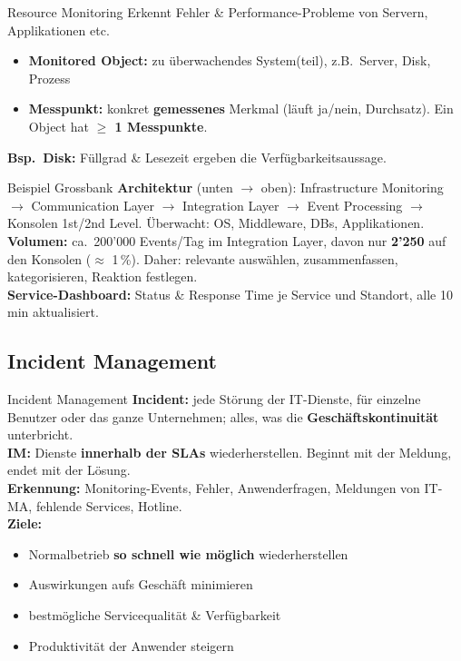 \documentclass[a4paper, fontsize=7pt]{scrartcl}
\begin{document}
\begin{mainbox}{Resource Monitoring}
Erkennt Fehler \& Performance-Probleme von Servern, Applikationen etc.
\begin{itemize}
    \item \textbf{Monitored Object:} zu überwachendes System(teil), z.B.\ Server,
          Disk, Prozess
    \item \textbf{Messpunkt:} konkret \textbf{gemessenes} Merkmal (läuft ja/nein,
          Durchsatz). Ein Object hat \textbf{$\ge$ 1 Messpunkte}.
\end{itemize}
\textbf{Bsp.\ Disk:} Füllgrad \& Lesezeit ergeben die Verfügbarkeitsaussage.
\end{mainbox}

\begin{subbox}{Beispiel Grossbank}
\textbf{Architektur} (unten $\to$ oben): Infrastructure Monitoring $\to$
Communication Layer $\to$ Integration Layer $\to$ Event Processing $\to$
Konsolen 1st/2nd Level. Überwacht: OS, Middleware, DBs, Applikationen.\\
\textbf{Volumen:} ca.\ 200'000 Events/Tag im Integration Layer, davon nur
\textbf{2'250} auf den Konsolen ($\approx$ 1\,\%). Daher: relevante auswählen,
zusammenfassen, kategorisieren, Reaktion festlegen.\\
\textbf{Service-Dashboard:} Status \& Response Time je Service und Standort,
alle 10\,min aktualisiert.
\end{subbox}

\subsection{Incident Management}

\begin{mainbox}{Incident Management}
\textbf{Incident:} jede Störung der IT-Dienste, für einzelne Benutzer oder das
ganze Unternehmen; alles, was die \textbf{Geschäftskontinuität} unterbricht.\\
\textbf{IM:} Dienste \textbf{innerhalb der SLAs} wiederherstellen. Beginnt mit
der Meldung, endet mit der Lösung.\\
\textbf{Erkennung:} Monitoring-Events, Fehler, Anwenderfragen, Meldungen von
IT-MA, fehlende Services, Hotline.\\
\textbf{Ziele:}
\begin{itemize}
    \item Normalbetrieb \textbf{so schnell wie möglich} wiederherstellen
    \item Auswirkungen aufs Geschäft minimieren
    \item bestmögliche Servicequalität \& Verfügbarkeit
    \item Produktivität der Anwender steigern
\end{itemize}
\end{mainbox}
\end{document}

